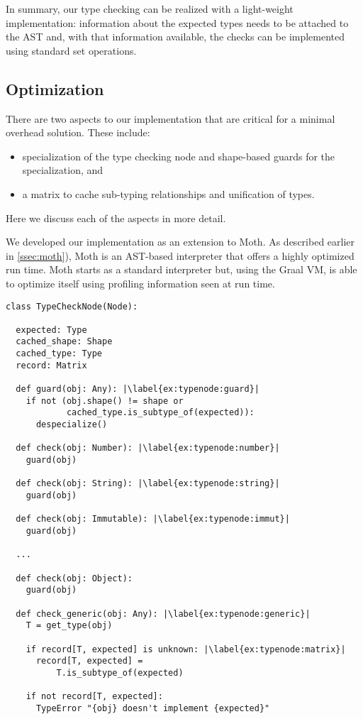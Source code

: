 In summary, our type checking can be realized with a light-weight implementation: 
information about the expected types needs to be attached to the AST and, 
with that information available,
the checks can be implemented using standard set operations.


\subsection{Optimization}
\label{ssec:optimization}

There are two aspects to our implementation that are critical for a minimal overhead solution. These include:

\begin{itemize}
  \item specialization of the type checking node and shape-based guards for the specialization, and
  \item a matrix to cache sub-typing relationships and unification of types.
\end{itemize}

Here we discuss each of the aspects in more detail.

We developed our implementation as an extension to Moth.
As described earlier in \cref{ssec:moth}),
Moth is an AST-based interpreter that offers a highly optimized run time.
Moth starts as a standard interpreter but,
using the Graal VM,
is able to optimize itself using profiling information seen at run time. 

\begin{lstlisting}[label={ex:typenode},escapechar=|,caption={An illustration of the type checking node that support type checking},float,floatplacement=htbp]
class TypeCheckNode(Node):

  expected: Type
  cached_shape: Shape
  cached_type: Type
  record: Matrix
  
  def guard(obj: Any): |\label{ex:typenode:guard}|
    if not (obj.shape() != shape or
            cached_type.is_subtype_of(expected)):
      despecialize()

  def check(obj: Number): |\label{ex:typenode:number}|
    guard(obj)

  def check(obj: String): |\label{ex:typenode:string}|
    guard(obj)

  def check(obj: Immutable): |\label{ex:typenode:immut}|
    guard(obj)

  ...

  def check(obj: Object):
    guard(obj)
  
  def check_generic(obj: Any): |\label{ex:typenode:generic}|
    T = get_type(obj)
    
    if record[T, expected] is unknown: |\label{ex:typenode:matrix}|
      record[T, expected] =
          T.is_subtype_of(expected)

    if not record[T, expected]:
      TypeError "{obj} doesn't implement {expected}"
\end{lstlisting}

